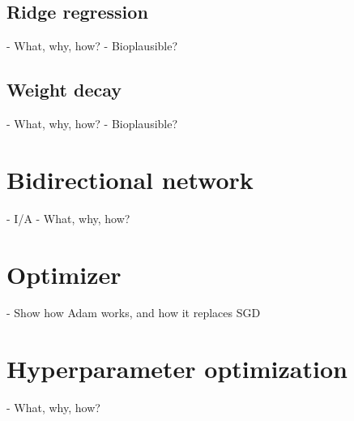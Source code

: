 	\subsection{Ridge regression}
		\begin{tcolorbox}[colback=orange]
		- What, why, how?
		- Bioplausible?

		\end{tcolorbox}

	\subsection{Weight decay}
		\begin{tcolorbox}[colback=orange]
		- What, why, how?
		- Bioplausible?

		\end{tcolorbox}


\section{Bidirectional network}
	\begin{tcolorbox}[colback=orange]
	- I/A
	- What, why, how?

	\end{tcolorbox}

\section{Optimizer}\label{sec:adam}
	\begin{tcolorbox}[colback=orange]
	- Show how Adam works, and how it replaces SGD

	\end{tcolorbox}


\section{Hyperparameter optimization}
	\begin{tcolorbox}[colback=orange]
	- What, why, how?

	\end{tcolorbox}


